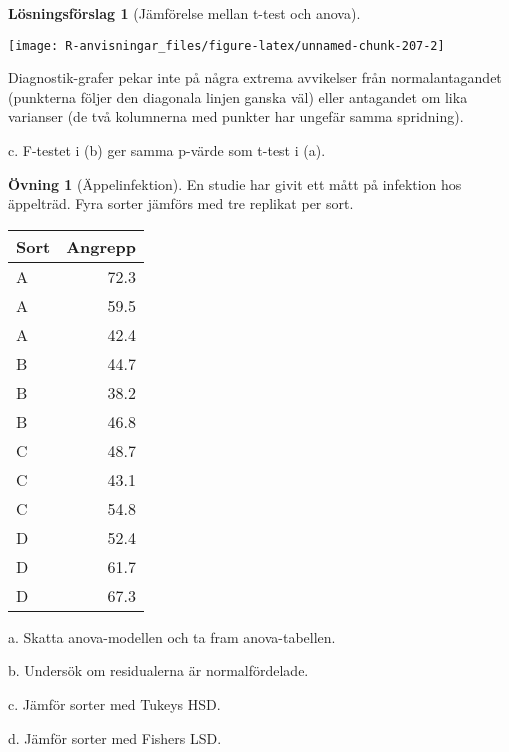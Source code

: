 \documentclass[
]{book}
\theoremstyle{definition}
\theoremstyle{definition}
\theoremstyle{definition}
\newtheorem{exercise}{Övning}[chapter]
\theoremstyle{definition}
\newtheorem{hypothesis}{Lösningsförslag}[chapter]
\theoremstyle{remark}
\begin{document}
\begin{hypothesis}[Jämförelse mellan t-test och anova]
\begin{center}\texttt{[image: R-anvisningar\_files/figure-latex/unnamed-chunk-207-2]} \end{center}

Diagnostik-grafer pekar inte på några extrema avvikelser från normalantagandet (punkterna följer den diagonala linjen ganska väl) eller antagandet om lika varianser (de två kolumnerna med punkter har ungefär samma spridning).

c. F-testet i (b) ger samma p-värde som t-test i (a).
\end{hypothesis}

\begin{exercise}[Äppelinfektion]
En studie har givit ett mått på infektion hos äppelträd. Fyra sorter jämförs med tre replikat per sort.

\begin{table}
\centering
\begin{tabular}[t]{lr}
\toprule
Sort & Angrepp\\
\midrule
A & 72.3\\
A & 59.5\\
A & 42.4\\
B & 44.7\\
B & 38.2\\
\addlinespace
B & 46.8\\
C & 48.7\\
C & 43.1\\
C & 54.8\\
D & 52.4\\
\addlinespace
D & 61.7\\
D & 67.3\\
\bottomrule
\end{tabular}
\end{table}

a. Skatta anova-modellen och ta fram anova-tabellen.

b. Undersök om residualerna är normalfördelade.

c. Jämför sorter med Tukeys HSD.

d. Jämför sorter med Fishers LSD.
\end{exercise}
\end{document}
